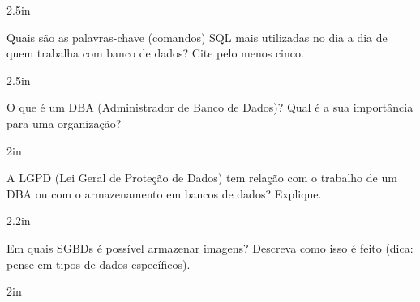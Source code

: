 \documentclass[12pt]{exam}
\begin{document}
\begin{questions}
\begin{solutionbox}{2.5in} \end{solutionbox}

\question Quais são as palavras-chave (comandos) SQL mais utilizadas no dia a dia de quem trabalha com banco de dados? Cite pelo menos cinco.

\begin{solutionbox}{2.5in} \end{solutionbox}

\question O que é um DBA (Administrador de Banco de Dados)? Qual é a sua importância para uma organização?

\begin{solutionbox}{2in} \end{solutionbox}

\question A LGPD (Lei Geral de Proteção de Dados) tem relação com o trabalho de um DBA ou com o armazenamento em bancos de dados? Explique.

\begin{solutionbox}{2.2in} \end{solutionbox}

\question Em quais SGBDs é possível armazenar imagens? Descreva como isso é feito (dica: pense em tipos de dados específicos).

\begin{solutionbox}{2in} \end{solutionbox}

\end{questions}
	
\end{document}
